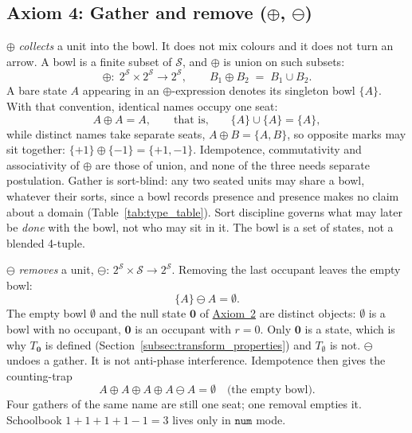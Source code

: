 \documentclass[12pt, a4paper]{article}
\begin{document}
\subsection{Axiom 4: Gather and remove ($\oplus$, $\ominus$)}
\label{subsec:axiom_idempotence}
$\oplus$ \emph{collects} a unit into the bowl. It does not mix colours
and it does not turn an arrow. A bowl is a finite subset of
$\mathcal{S}$, and $\oplus$ is union on such subsets:
\[
\oplus:\; 2^{\mathcal{S}}\times 2^{\mathcal{S}}
\longrightarrow 2^{\mathcal{S}},
\qquad
B_1 \oplus B_2 \;=\; B_1 \cup B_2 .
\]
A bare state $A$ appearing in an $\oplus$-expression denotes its
singleton bowl $\{A\}$. With that convention, identical names occupy
one seat:
\begin{equation}
    A \oplus A = A,
    \qquad\text{that is,}\qquad
    \{A\}\cup\{A\}=\{A\},
    \label{eq:idempotence_formal}
\end{equation}
while distinct names take separate seats, $A\oplus B=\{A,B\}$, so
opposite marks may sit together:
$\{+1\}\oplus\{-1\}=\{+1,-1\}$.
Idempotence, commutativity and associativity of $\oplus$ are those of
union, and none of the three needs separate postulation.
Gather is sort-blind: any two seated units may share a bowl, whatever
their sorts, since a bowl records presence and presence makes no claim
about a domain (Table~\ref{tab:type_table}). Sort discipline governs
what may later be \emph{done} with the bowl, not who may sit in it.
The bowl is a set of states, not a blended 4-tuple.

$\ominus$ \emph{removes} a unit,
$\ominus:\,2^{\mathcal{S}}\times\mathcal{S}\to 2^{\mathcal{S}}$.
Removing the last occupant leaves the empty bowl:
\begin{equation}
    \{A\}\ominus A = \emptyset.
    \label{eq:ominus_empty}
\end{equation}
The empty bowl $\emptyset$ and the null state $\mathbf{0}$ of
\hyperref[subsec:axiom_null]{Axiom~2} are distinct objects: $\emptyset$ is a
bowl with no occupant, $\mathbf{0}$ is an occupant with $r=0$. Only
$\mathbf{0}$ is a state, which is why $T_{\mathbf{0}}$ is defined
(Section~\ref{subsec:transform_properties}) and $T_{\emptyset}$ is
not.
$\ominus$ undoes a gather. It is not anti-phase interference.
Idempotence then gives the counting-trap
\begin{equation}
    A \oplus A \oplus A \oplus A \ominus A = \emptyset
    \quad\text{(the empty bowl)}.
    \label{eq:four_a_ominus}
\end{equation}
Four gathers of the same name are still one seat; one removal empties
it. Schoolbook $1+1+1+1-1=3$ lives only in $\mathtt{num}$ mode.
\end{document}
